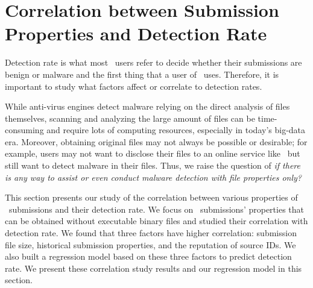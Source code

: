 \section{Correlation between Submission Properties and Detection Rate}
\label{sec:corr}
Detection rate is what most \vt\ users refer to decide whether their submissions
are benign or malware and the first thing that a user of \vt\ uses. 
Therefore, it is important to study what factors affect or correlate to detection rates. 

While anti-virus engines detect malware relying on the direct analysis of files themselves, 
scanning and analyzing the large amount of files can be time-consuming and require lots of computing resources, 
especially in today's big-data era.
Moreover, obtaining original files may not always be possible or desirable;
for example, users may not want to disclose their files to an online service like \vt\ but still want to detect malware in their files.
Thus, we raise the question of {\em if there is any way to assist or even conduct malware detection with file properties only?}


This section presents our study of the correlation between various properties of
\pe\ submissions and their detection rate. 
We focus on \vt\ submissions' properties that can be obtained without executable binary files
and studied their correlation with detection rate.
We found that three factors have higher correlation:
submission file size,
historical submission properties, and the reputation of source IDs.
We also built a regression model based on these three factors to predict detection rate.
We present these correlation study results and our regression model in this section.


%


